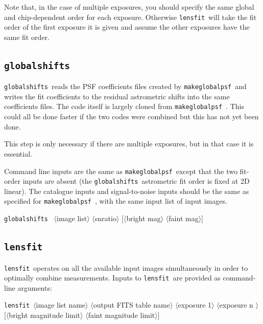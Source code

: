 \documentclass{article}
\def\lensfit{{\tt lensfit}\ }
\def\globalshifts{{\tt globalshifts}\ }
\def\makeglobalpsf{{\tt makeglobalpsf}\ }
\def\<{{$\langle$}}
\def\>{{$\rangle$}}
\begin{document}
Note that, in the case of multiple exposures, you should specify the same global and chip-dependent order
for each exposure.  Otherwise \lensfit will take the fit order of the first exposure it is given and assume
the other exposures have the same fit order.

\subsection{\globalshifts}
\globalshifts reads the PSF coefficients files created by \makeglobalpsf and writes the fit coefficients
to the residual astrometric shifts into the same coefficients files.  The code itself is largely cloned from
\makeglobalpsf.  This could all be done faster if the two codes were combined but this has not yet been done.

This step is only necessary if there are multiple exposures, but in that case it is essential.

Command line inputs are the same as \makeglobalpsf except that the two fit-order inputs are absent 
(the \globalshifts astrometric fit order is fixed at 2D linear).  The catalogue inputs and signal-to-noise inputs
should be the same as specified for \makeglobalpsf, with the same input list of input images.

\globalshifts
\<image list\> \<snratio\> [\<bright mag\> \<faint mag\>] 

\subsection{\lensfit}\label{sec:lensfit}

\lensfit operates on all the available input images simultaneously in order to optimally combine 
measurements. Inputs to \lensfit are provided as command-line arguments: 

\lensfit \<image list name\> \<output FITS table name\> \<exposure 1\> 
\<exposure n \> [\<bright magnitude limit\> \<faint magnitude limit\>] 
\end{document}
